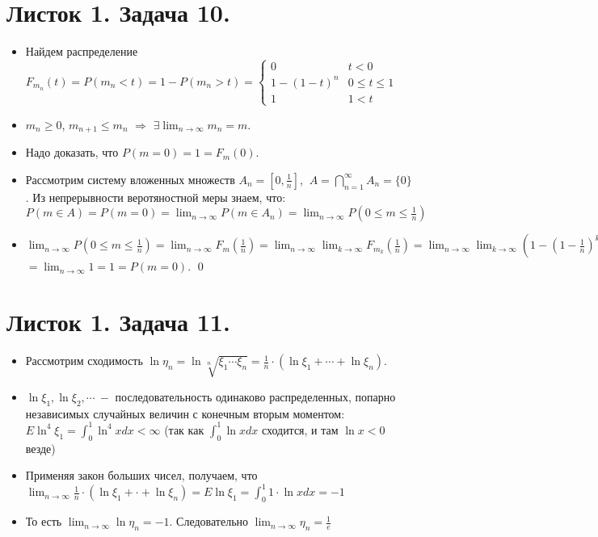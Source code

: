 \section*{Листок 1. Задача 10.}
\begin{itemize}
    \item Найдем распределение $F_{m_{n}}(t) = P\left(m_{n} < t\right) = 1 - P\left(m_{n} > t\right) = \begin{cases} 0 & t < 0 \\
    1 - \left(1 - t\right) ^ n & 0 \leq t \leq 1 \\
    1 & 1 < t
    \end{cases}$
    \item $m_{n} \geq 0$, $m_{n + 1} \leq m_{n}$ $\Rightarrow$ $\exists \lim_{n \to \infty} m_{n} = m$.
    \item Надо доказать, что $P(m = 0) = 1 = F_m(0)$.
    \item Рассмотрим систему вложенных множеств $A_n = \left[0, \frac{1}{n}\right]$, $\ A = \bigcap_{n = 1}^{\infty} A_{n} = \{0\}$. Из непрерывности веротяностной меры знаем, что: \\ $P\left(m \in A\right) = P(m = 0) = \lim_{n \to \infty} P\left(m \in A_{n}\right) = \lim_{n \to \infty} P\left(0 \leq m \leq \frac{1}{n}\right)$
    \item $\lim_{n \to \infty} P\left(0 \leq m \leq \frac{1}{n}\right) = \lim_{n \to \infty} F_{m}\left(\frac{1}{n}\right) =\lim_{n \to \infty} \lim_{k \to \infty} F_{m_{k}}\left(\frac{1}{n}\right) = \lim_{n \to \infty} \lim_{k \to \infty} \left(1 - \left(1 - \frac{1}{n}\right) ^ k\right) = $\\$=\lim_{n \to \infty} 1 = 1 = P\left(m = 0\right)$. \qed{}
\end{itemize}
\section*{Листок 1. Задача 11.}
\begin{itemize}
    \item Рассмотрим сходимость $\ln \eta_{n} = \ln \sqrt[n]{\xi_{1} \cdots \xi_{n}} = \frac{1}{n} \cdot \left(\ln \xi_{1} + \cdots + \ln \xi_{n}\right)$.
    \item $\ln \xi_1, \ln \xi_{2}, \cdots \ -$ последовательность одинаково распределенных, попарно независимых случайных величин с конечным вторым моментом:
    \\$E \ln ^ 4 \xi_{1} = \int_{0}^{1} \ln ^ 4 x dx < \infty$ (так как $\int_{0}^{1} \ln x dx $ сходится, и там $\ln x < 0$ везде)
    \item Применяя закон больших чисел, получаем, что \\$ \lim_{n \to \infty}\frac{1}{n} \cdot \left(\ln \xi_{1} + \cdot + \ln \xi_{n}\right) = E \ln \xi_{1} = \int_{0}^{1} 1 \cdot \ln x dx = -1$
    \item То есть $\lim_{n \to \infty} \ln \eta_n = -1$. Следовательно $\lim_{n \to \infty} \eta_{n} = \frac{1}{e}$
\end{itemize}
